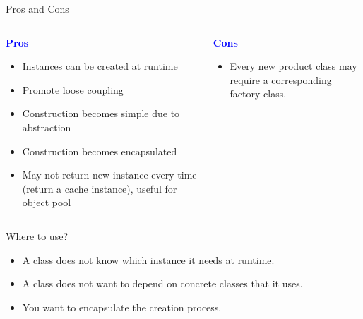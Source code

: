 \documentclass[13pt]{beamer}
\begin{document}
\begin{frame}{Pros and Cons}
\begin{columns}[T]
\begin{column}{.45\textwidth}
	\begin{center}
	\textcolor{blue}{\textbf{Pros}}
	\end{center}
	\begin{itemize}
		\item Instances can be created at runtime
		\item Promote loose coupling
		\item Construction becomes simple due to abstraction
		\item Construction becomes encapsulated
		\item May not return new instance every time (return a cache instance), useful for object pool
	\end{itemize}
\end{column}
\begin{column}{.45\textwidth}
	\begin{center}
	\textcolor{blue}{\textbf{Cons}}
	\end{center}
		\begin{itemize}
		\setlength\itemsep{1em}
		\item Every new product class may require a corresponding factory class.
	\end{itemize}
\end{column}
\end{columns}
\end{frame}

\begin{frame}{Where to use?}	
	\begin{itemize}
		\setlength\itemsep{1em}
		\item A class does not know which instance it needs at runtime.
		\item A class does not want to depend on concrete classes that it uses.
		\item You want to encapsulate the creation process.
	\end{itemize}
\end{frame}
\end{document}
